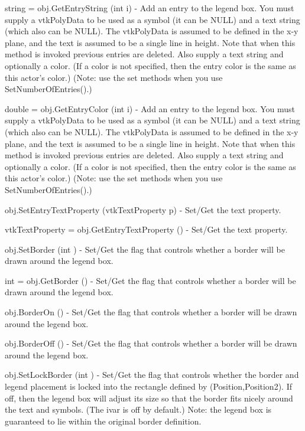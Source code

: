 \begin{DoxyItemize}
\item {\ttfamily string = obj.\-Get\-Entry\-String (int i)} -\/ Add an entry to the legend box. You must supply a vtk\-Poly\-Data to be used as a symbol (it can be N\-U\-L\-L) and a text string (which also can be N\-U\-L\-L). The vtk\-Poly\-Data is assumed to be defined in the x-\/y plane, and the text is assumed to be a single line in height. Note that when this method is invoked previous entries are deleted. Also supply a text string and optionally a color. (If a color is not specified, then the entry color is the same as this actor's color.) (Note\-: use the set methods when you use Set\-Number\-Of\-Entries().)  
\item {\ttfamily double = obj.\-Get\-Entry\-Color (int i)} -\/ Add an entry to the legend box. You must supply a vtk\-Poly\-Data to be used as a symbol (it can be N\-U\-L\-L) and a text string (which also can be N\-U\-L\-L). The vtk\-Poly\-Data is assumed to be defined in the x-\/y plane, and the text is assumed to be a single line in height. Note that when this method is invoked previous entries are deleted. Also supply a text string and optionally a color. (If a color is not specified, then the entry color is the same as this actor's color.) (Note\-: use the set methods when you use Set\-Number\-Of\-Entries().)  
\item {\ttfamily obj.\-Set\-Entry\-Text\-Property (vtk\-Text\-Property p)} -\/ Set/\-Get the text property.  
\item {\ttfamily vtk\-Text\-Property = obj.\-Get\-Entry\-Text\-Property ()} -\/ Set/\-Get the text property.  
\item {\ttfamily obj.\-Set\-Border (int )} -\/ Set/\-Get the flag that controls whether a border will be drawn around the legend box.  
\item {\ttfamily int = obj.\-Get\-Border ()} -\/ Set/\-Get the flag that controls whether a border will be drawn around the legend box.  
\item {\ttfamily obj.\-Border\-On ()} -\/ Set/\-Get the flag that controls whether a border will be drawn around the legend box.  
\item {\ttfamily obj.\-Border\-Off ()} -\/ Set/\-Get the flag that controls whether a border will be drawn around the legend box.  
\item {\ttfamily obj.\-Set\-Lock\-Border (int )} -\/ Set/\-Get the flag that controls whether the border and legend placement is locked into the rectangle defined by (Position,Position2). If off, then the legend box will adjust its size so that the border fits nicely around the text and symbols. (The ivar is off by default.) Note\-: the legend box is guaranteed to lie within the original border definition.  

\end{DoxyItemize}
